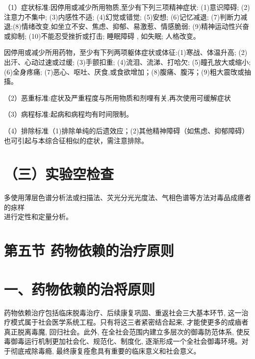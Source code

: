 \documentclass[10pt]{article}
\begin{document}
（1）症状标准:因停用或减少所用物质,至少有下列三项精神症状: (1)意识障碍; (2)注意力不集中; (3)内感性不适; (4)幻觉或错觉; (5)安想; (6)记忆减退; (7)判断力减退;(8)情绪改变,如坐立不安、焦虑、抑郁、易激惹、情感脆弱; (9)精神运动性兴奋或抑制; (10)不能忍受挫折或打击; 睡眠障碍 , 如失眠; 人格改变。

因停用或减少所用药物，至少有下列两项躯体症状或体征:(1)寒战、体温升高; (2)出汗、心动过速或过缓; (3)手颤扣重; (4)流泪、流涕、打哈欠; (5)瞳孔放大或缩小; (6)全身疼痛; (7)恶心、呕吐、厌食,或食欲增加；(8)腹痛、腹泻；(9)粗大震攺或抽搐。

（2）恶重标准:症状及严重程度与所用物质和剂哩有关,再次使用可缓解症状

（3）病程标准:起病和病程均有时间限制。

（4）排除标准（1)排除单纯的后遗效应；(2)其他精神障碍（如焦虑、抑郁障碍）也可引起与本综合征相似的症状，需注意排除。

\section*{（三）实验空检查}
多使用薄层色谱分析法或扫描法、苂光分光光度法、气相色谱等方法对毒品成癔者的㽷样\\
进行定性和定量分析。

\section*{第五节 药物依赖的治疗原则}
\section*{一、药物依赖的治将原则}
药物依赖治疗包括临床脱毒治疗、后续康复巩固、重返社会三大基本环节, 这一治疗模式属于社会医学系统工程。只有将这三者紧密结合起来, 才能使更多的成㾄者真正脱离毒魔, 回归社会。此外, 在全社会范围内建立多层次的御毒防范体系, 使反毒御毒运行机制更加社会化、规范化、制度化, 逐渐形成一个全社会御毒环境。对于彻底戒除毒瘾, 最终康复痊愈具有重要的临床意义和社会意义。
\end{document}
